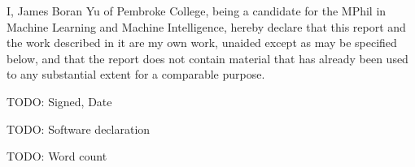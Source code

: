 
\begin{declaration}
  I, James Boran Yu of Pembroke College, being a candidate for the MPhil in Machine Learning and Machine Intelligence, hereby declare that this report and the work described in it are my own work, unaided except as may be specified below, and that the report does not contain material that has already been used to any substantial extent for a comparable purpose.

  TODO: Signed, Date

  TODO: Software declaration

  TODO: Word count

\end{declaration}
